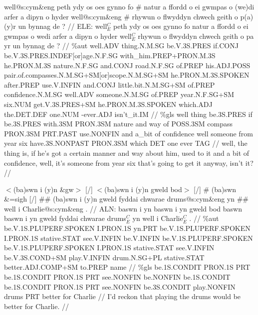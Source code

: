 \documentclass[a4paper,10pt]{article}
\begin{document}
\ex
\begingl[lingstyle=gergl]
\glchat well@s:cym\&eng peth ydy os oes gynno fo \# natur a ffordd o ei gwmpas o (we)di arfer a dipyn o hyder well@s:cym\&eng \# rhywun o flwyddyn chwech geith o p(a) (y)r un bynnag de ? //
\glsurface ELE:  well$^{C}_{E}$ peth ydy os oes gynno fo natur a ffordd o ei gwmpas o wedi arfer a dipyn o hyder well$^{C}_{E}$ rhywun o flwyddyn chwech geith o pa yr un bynnag de ?  //
\glauto \%aut  well{\scriptsize .ADV} thing{\scriptsize .N.M.SG} be{\scriptsize .V.3S.PRES} if{\scriptsize .CONJ} be{\scriptsize .V.3S.PRES.INDEF[or]age.N.F.SG} with\_him{\scriptsize .PREP+PRON.M.3S} he{\scriptsize .PRON.M.3S} nature{\scriptsize .N.F.SG} and{\scriptsize .CONJ} road{\scriptsize .N.F.SG} of{\scriptsize .PREP} his{\scriptsize .ADJ.POSS} pair{\scriptsize .of.compasses.N.M.SG+SM[or]scope.N.M.SG+SM} he{\scriptsize .PRON.M.3S.SPOKEN} after{\scriptsize .PREP} use{\scriptsize .V.INFIN} and{\scriptsize .CONJ} little{\scriptsize .bit.N.M.SG+SM} of{\scriptsize .PREP} confidence{\scriptsize .N.M.SG} well{\scriptsize .ADV} someone{\scriptsize .N.M.SG} of{\scriptsize .PREP} year{\scriptsize .N.F.SG+SM} six{\scriptsize .NUM} get{\scriptsize .V.3S.PRES+SM} he{\scriptsize .PRON.M.3S.SPOKEN} which{\scriptsize .ADJ} the{\scriptsize .DET.DEF} one{\scriptsize .NUM} -ever{\scriptsize .ADJ} isn't\_it{\scriptsize .IM}   //
\glmanual \%gls  well thing be{\scriptsize .3S.PRES} if be{\scriptsize .3S.PRES} with{\scriptsize .3SM} PRON{\scriptsize .3SM} nature and way of POSS{\scriptsize .3SM} compass PRON{\scriptsize .3SM} PRT{\scriptsize .PAST} use{\scriptsize .NONFIN} and a\_bit of confidence well someone from year six have{\scriptsize .3S.NONPAST} PRON{\scriptsize .3SM} which DET one ever TAG   //
\gleng well, the thing is, if he's got a certain manner and way about him, used to it and a bit of confidence, well, it's someone from year six that's going to get it anyway, isn't it? //
\endgl
\xe

\ex
\begingl[lingstyle=gergl]
\glchat $<$(ba)swn i (y)n \&gw$>$ [/] $<$(ba)swn i (y)n gweld bod$>$ [/] \# (ba)swn \&=sigh [/] \#\# (ba)swn i (y)n gweld fyddai chwarae drums@s:cym\&eng yn \#\# well i Charlie@s:cym\&eng . //
\glsurface ALN:  baswn i yn baswn i yn gweld bod baswn baswn i yn gweld fyddai chwarae drums$^{C}_{E}$ yn well i Charlie$^{C}_{E}$ .  //
\glauto \%aut  be{\scriptsize .V.1S.PLUPERF.SPOKEN} I{\scriptsize .PRON.1S} yn{\scriptsize .PRT} be{\scriptsize .V.1S.PLUPERF.SPOKEN} I{\scriptsize .PRON.1S} stative{\scriptsize .STAT} see{\scriptsize .V.INFIN} be{\scriptsize .V.INFIN} be{\scriptsize .V.1S.PLUPERF.SPOKEN} be{\scriptsize .V.1S.PLUPERF.SPOKEN} I{\scriptsize .PRON.1S} stative{\scriptsize .STAT} see{\scriptsize .V.INFIN} be{\scriptsize .V.3S.COND+SM} play{\scriptsize .V.INFIN} drum{\scriptsize .N.SG+PL} stative{\scriptsize .STAT} better{\scriptsize .ADJ.COMP+SM} to{\scriptsize .PREP} name   //
\glmanual \%gls  be{\scriptsize .1S.CONDIT} PRON{\scriptsize .1S} PRT be{\scriptsize .1S.CONDIT} PRON{\scriptsize .1S} PRT see{\scriptsize .NONFIN} be{\scriptsize .NONFIN} be{\scriptsize .1S.CONDIT} be{\scriptsize .1S.CONDIT} PRON{\scriptsize .1S} PRT see{\scriptsize .NONFIN} be{\scriptsize .3S.CONDIT} play{\scriptsize .NONFIN} drums PRT better for Charlie   //
\gleng I'd reckon that playing the drums would be better for Charlie. //
\endgl
\xe
\end{document}

